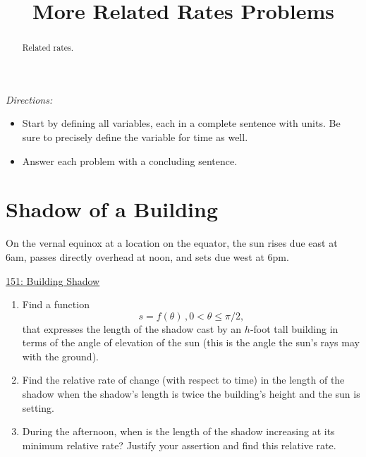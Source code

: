 \documentclass{ximera}
\title{More Related Rates Problems}
\begin{document}
\begin{abstract}
Related rates.
\end{abstract}
\maketitle


\emph{Directions:}
\begin{itemize}
\item Start by defining all variables, each in a complete sentence with units. Be sure to precisely define the variable for time as well.

\item Answer each problem with a concluding sentence.
\end{itemize}



\section{Shadow of a Building}

\begin{question} \label{Q5:RightTriangle}
On the vernal equinox at a location on the equator, the sun rises due east at 6am, passes directly overhead at noon, and sets due west at 6pm. 

\href{https://www.desmos.com/calculator/yivhlevglh}{151: Building Shadow}
 
\begin{onlineOnly}
    \begin{center}
\end{center}
\end{onlineOnly}

\begin{enumerate}
\item Find a function 
\[
    s = f(\theta) \, , 0  <  \theta \leq \pi/2 ,
\]
that expresses the length of the shadow cast by an $h$-foot tall building in terms of the angle of elevation of the sun (this is the angle the sun's rays may with the ground). 

\item Find the relative rate of change (with respect to time) in the length of the shadow when the shadow's length is twice the building's height and the sun is setting.

\item During the afternoon, when is the length of the shadow increasing at its minimum relative rate? Justify your assertion and find this relative rate. 
 
\end{enumerate}



\end{question}
\end{document}
